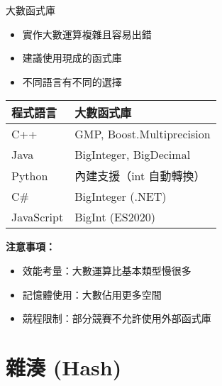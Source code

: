 \documentclass{beamer}
\begin{document}
\begin{frame}{大數函式庫}
\begin{itemize}
    \item 實作大數運算複雜且容易出錯
    \item 建議使用現成的函式庫
    \item 不同語言有不同的選擇
\end{itemize}

\vspace{1em}
\begin{center}
\renewcommand{\arraystretch}{1.3}
\begin{tabular}{|>{\centering\arraybackslash}m{2.5cm}|>{\raggedright\arraybackslash}m{6cm}|}
\hline
\textbf{程式語言} & \textbf{大數函式庫} \\
\hline
C++ & GMP, Boost.Multiprecision \\
\hline
Java & BigInteger, BigDecimal \\
\hline
Python & 內建支援（int 自動轉換） \\
\hline
C\# & BigInteger (.NET) \\
\hline
JavaScript & BigInt (ES2020) \\
\hline
\end{tabular}
\end{center}

\vspace{1em}
\textbf{注意事項：}
\begin{itemize}
    \item 效能考量：大數運算比基本類型慢很多
    \item 記憶體使用：大數佔用更多空間
    \item 競程限制：部分競賽不允許使用外部函式庫
\end{itemize}
\end{frame}

\section{雜湊 (Hash)}
\end{document}
